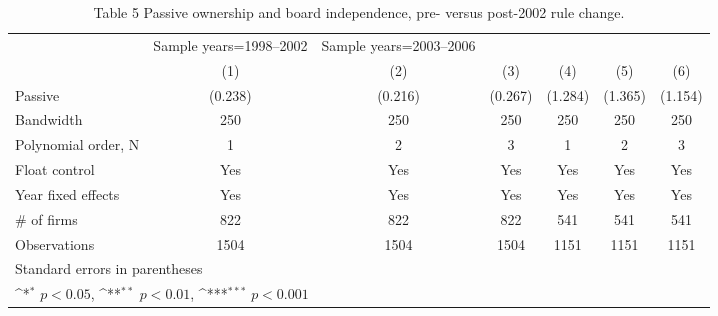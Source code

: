 \begin{table}[htbp]\centering
\def\sym#1{\ifmmode^{#1}\else\(^{#1}\)\fi}
\caption{Table 5 Passive ownership and board independence, pre- versus post-2002 rule change.}
\begin{tabular}{l*{6}{c}}
\hline\hline
                    &Sample years=1998–2002         &Sample years=2003–2006         &                     &                     &                     &                     \\
                    &\multicolumn{1}{c}{(1)}         &\multicolumn{1}{c}{(2)}         &\multicolumn{1}{c}{(3)}         &\multicolumn{1}{c}{(4)}         &\multicolumn{1}{c}{(5)}         &\multicolumn{1}{c}{(6)}         \\
\hline
Passive %
                    &     (0.238)         &     (0.216)         &     (0.267)         &     (1.284)         &     (1.365)         &     (1.154)         \\
\hline
Bandwidth           &         250         &         250         &         250         &         250         &         250         &         250         \\
Polynomial order, N &           1         &           2         &           3         &           1         &           2         &           3         \\
Float control       &         Yes         &         Yes         &         Yes         &         Yes         &         Yes         &         Yes         \\
Year fixed effects  &         Yes         &         Yes         &         Yes         &         Yes         &         Yes         &         Yes         \\
# of firms          &         822         &         822         &         822         &         541         &         541         &         541         \\
Observations        &        1504         &        1504         &        1504         &        1151         &        1151         &        1151         \\
\hline\hline
\multicolumn{7}{l}{\footnotesize Standard errors in parentheses}\\
\multicolumn{7}{l}{\footnotesize \sym{*} \(p<0.05\), \sym{**} \(p<0.01\), \sym{***} \(p<0.001\)}\\
\end{tabular}
\end{table}
